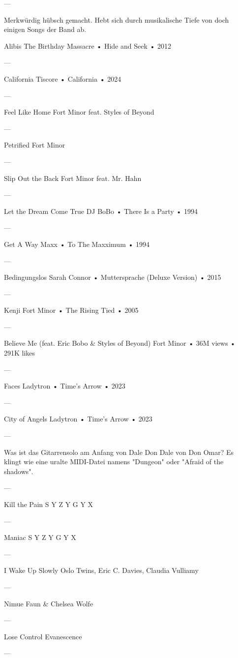 —

Merkwürdig hübsch gemacht.
Hebt sich durch musikalische Tiefe von doch einigen Songs der Band ab.

Alibis
The Birthday Massacre
 •
Hide and Seek
 •
2012

—

California
Tiscore
 •
California
 •
2024

—

Feel Like Home
Fort Minor feat. Styles of Beyond

—

Petrified
Fort Minor

—

Slip Out the Back
Fort Minor feat. Mr. Hahn

—

Let the Dream Come True
DJ BoBo
 •
There Is a Party
 • 1994

—

Get A Way
Maxx
 •
To The Maxximum
 • 1994

—

Bedingungslos
Sarah Connor
 •
Muttersprache (Deluxe Version)
 • 2015

—

Kenji
Fort Minor
 •
The Rising Tied
 • 2005

—

Believe Me (feat. Eric Bobo & Styles of Beyond)
Fort Minor
 • 36M views • 291K likes

—

Faces
Ladytron
 •
Time's Arrow
 • 2023

—

City of Angels
Ladytron
 •
Time's Arrow
 • 2023

—

Was ist das Gitarrensolo am Anfang von Dale Don Dale von Don Omar?
Es klingt wie eine uralte MIDI-Datei namens "Dungeon" oder "Afraid of the shadows".


—

Kill the Pain
S Y Z Y G Y X

—

Maniac
S Y Z Y G Y X

—

I Wake Up Slowly
Oslo Twins, Eric C. Davies, Claudia Vulliamy

—

Nimue
Faun & Chelsea Wolfe

—

Lose Control
Evanescence

—

